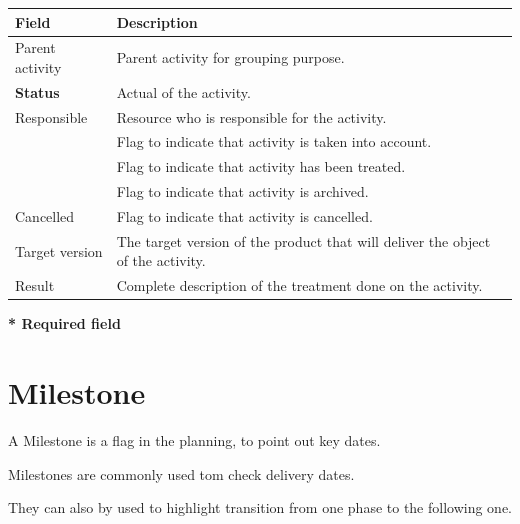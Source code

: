 \documentclass[letterpaper,10pt,english]{sphinxmanual}
\begin{document}
\begin{tabulary}{\linewidth}{|l|l|}
\hline
\textsf{\relax 
Field
} & \textsf{\relax 
Description
}\\
\hline
Parent activity
 & 
Parent activity for grouping purpose.
\\
\hline
\textbf{Status}
 & 
Actual {\hyperref[Glossary:term-status]{\emph{}}} of the activity.
\\
\hline
Responsible
 & 
Resource who is responsible for the activity.
\\
\hline
{\hyperref[Glossary:term-handled]{\emph{}}}
 & 
Flag to indicate that activity is taken into account.
\\
\hline
{\hyperref[Glossary:term-done]{\emph{}}}
 & 
Flag to indicate that activity has been treated.
\\
\hline
{\hyperref[Glossary:term-closed]{\emph{}}}
 & 
Flag to indicate that activity is archived.
\\
\hline
Cancelled
 & 
Flag to indicate that activity is cancelled.
\\
\hline
Target version
 & 
The target version of the product that will deliver the object of the activity.
\\
\hline
Result
 & 
Complete description of the treatment done on the activity.
\\
\hline\end{tabulary}


\textbf{* Required field}
\newpage
{}

\section{Milestone}
\label{PlanningElements:milestone}\label{PlanningElements:index-2}\label{PlanningElements:pe-milestone-label}
A Milestone is a flag in the planning, to point out key dates.

Milestones are commonly used tom check delivery dates.

They can also by used to highlight transition from one phase to the following one.
\end{document}
